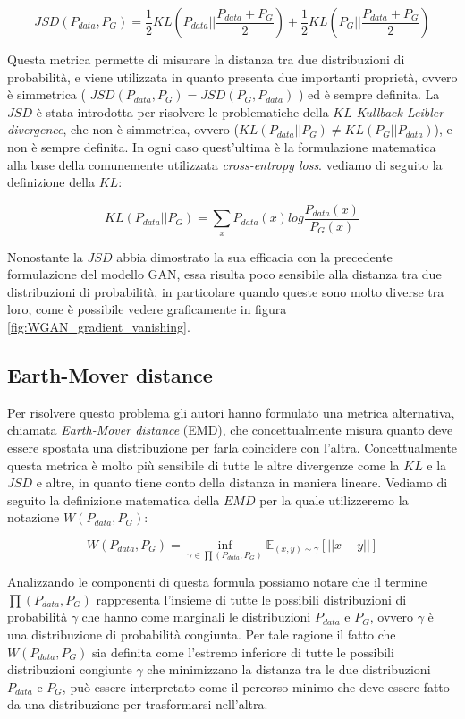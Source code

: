 \begin{equation}
    \label{eq:JSD}
    JSD(P_{data},P_{G}) = \frac{1}{2}KL(P_{data}||\frac{P_{data}+P_{G}}{2}) + \frac{1}{2}KL(P_{G}||\frac{P_{data}+P_{G}}{2})
\end{equation}

Questa metrica permette di misurare la distanza tra due distribuzioni di probabilità, e viene utilizzata in quanto presenta due importanti proprietà,
ovvero è simmetrica ( $JSD(P_{data},P_{G}) = JSD(P_{G},P_{data})$ ) ed è sempre definita.
La $JSD$ è stata introdotta per risolvere le problematiche della $KL$ \textit{Kullback-Leibler divergence}, che non è simmetrica, ovvero ($KL(P_{data}||P_{G}) \neq KL(P_{G}||P_{data})$),
e non è sempre definita. In ogni caso quest'ultima è la formulazione matematica alla base della comunemente utilizzata \textit{cross-entropy loss}. 
vediamo di seguito la definizione della $KL$:

\begin{equation}
    KL(P_{data}||P_{G}) = \sum_{x}P_{data}(x)log\frac{P_{data}(x)}{P_{G}(x)}
\end{equation}

Nonostante la $JSD$ abbia dimostrato la sua efficacia con la precedente formulazione del modello GAN, essa risulta poco sensibile alla distanza 
tra due distribuzioni di probabilità, in particolare quando queste sono molto diverse tra loro, come è possibile vedere graficamente in figura \ref{fig:WGAN_gradient_vanishing}.

\subsection{Earth-Mover distance}
Per risolvere questo problema gli autori hanno formulato una metrica alternativa, chiamata \textit{Earth-Mover distance} (EMD),
che concettualmente misura quanto deve essere spostata una distribuzione per farla coincidere con l'altra.
Concettualmente questa metrica è molto più sensibile di tutte le altre divergenze come la $KL$ e la $JSD$ e altre, in quanto tiene conto della distanza
in maniera lineare. Vediamo di seguito la definizione matematica della $EMD$ per la quale utilizzeremo la notazione $W(P_{data},P_{G})$:

\begin{equation}
    W(P_{data},P_{G}) = \inf_{\gamma \in \prod(P_{data},P_{G})}\mathbb{E}_{(x,y)\sim \gamma}[||x-y||]
\end{equation}

Analizzando le componenti di questa formula possiamo notare che il termine $\prod(P_{data},P_{G})$ rappresenta l'insieme di tutte le possibili distribuzioni
di probabilità $\gamma$ che hanno come marginali le distribuzioni $P_{data}$ e $P_{G}$, ovvero $\gamma$ è una distribuzione di probabilità congiunta.
Per tale ragione il fatto che $W(P_{data},P_{G})$ sia definita come l'estremo inferiore di tutte le possibili distribuzioni congiunte $\gamma$ 
che minimizzano la distanza tra le due distribuzioni $P_{data}$ e $P_{G}$, può essere interpretato come
il percorso minimo che deve essere fatto da una distribuzione per trasformarsi nell'altra.


